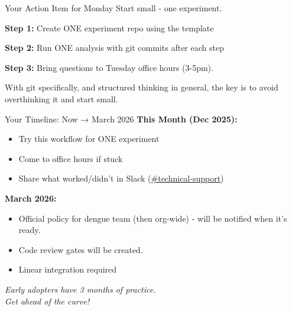 \documentclass{beamer}
\begin{document}
    \begin{frame}{Your Action Item for Monday}
        \Large
        Start small - one experiment.
        
        \vspace{1em}
        \normalsize
        \textbf{Step 1:} Create ONE experiment repo using the template
        
        \textbf{Step 2:} Run ONE analysis with git commits after each step
        
        \textbf{Step 3:} Bring questions to Tuesday office hours (3-5pm).
        
        \vspace{2em}
        \large
        With git specifically, and structured thinking in general, the key is to avoid overthinking it and start small.
        \end{frame}

\begin{frame}{Your Timeline: Now → March 2026}
\textbf{This Month (Dec 2025):}
\begin{itemize}
    \item Try this workflow for ONE experiment
    \item Come to office hours if stuck
    \item Share what worked/didn't in Slack (\href{https://artpark-in.slack.com/archives/C0638EBD84D}{#technical-support})
\end{itemize}

\vspace{1em}
\textbf{March 2026:}
\begin{itemize}
    \item Official policy for dengue team (then org-wide) - will be notified when it's ready.
    \item Code review gates will be created.
    \item Linear integration required
\end{itemize}

\vspace{1em}
\textit{Early adopters have 3 months of practice. \\
Get ahead of the curve!}
\end{frame}
\end{document}
